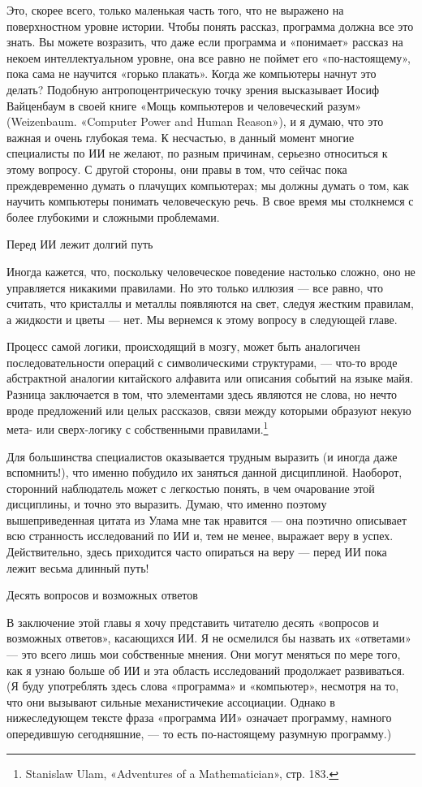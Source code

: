 \documentclass[../main.tex]{subfiles}
\begin{document}
Это, скорее всего, только маленькая часть того, что не выражено на поверхностном уровне истории. Чтобы понять рассказ, программа должна все это знать. Вы можете возразить, что даже если программа и «понимает» рассказ на некоем интеллектуальном уровне, она все равно не поймет его «по-настоящему», пока сама не научится «горько плакать». Когда же компьютеры начнут это делать? Подобную антропоцентрическую точку зрения высказывает Иосиф Вайценбаум в своей книге «Мощь компьютеров и человеческий разум» (Weizenbaum. «Computer Power and Human Reason»), и я думаю, что это важная и очень глубокая тема. К несчастью, в данный момент многие специалисты по ИИ не желают, по разным причинам, серьезно относиться к этому вопросу. С другой стороны, они правы в том, что сейчас пока преждевременно думать о плачущих компьютерах; мы должны думать о том, как научить компьютеры понимать человеческую речь. В свое время мы столкнемся с более глубокими и сложными проблемами.

Перед ИИ лежит долгий путь

Иногда кажется, что, поскольку человеческое поведение настолько сложно, оно не управляется никакими правилами. Но это только иллюзия --- все равно, что считать, что кристаллы и металлы появляются на свет, следуя жестким правилам, а жидкости и цветы --- нет. Мы вернемся к этому вопросу в следующей главе.

Процесс самой логики, происходящий в мозгу, может быть аналогичен последовательности операций с символическими структурами, --- что-то вроде абстрактной аналогии китайского алфавита или описания событий на языке майя. Разница заключается в том, что элементами здесь являются не слова, но нечто вроде предложений или целых рассказов, связи между которыми образуют некую мета- или сверх-логику с собственными правилами.\footnote{Stanislaw Ulam, «Adventures of a Mathematician», стр. 183.}

Для большинства специалистов оказывается трудным выразить (и иногда даже вспомнить!), что именно побудило их заняться данной дисциплиной. Наоборот, сторонний наблюдатель может с легкостью понять, в чем очарование этой дисциплины, и точно это выразить. Думаю, что именно поэтому вышеприведенная цитата из Улама мне так нравится --- она поэтично описывает всю странность исследований по ИИ и, тем не менее, выражает веру в успех. Действительно, здесь приходится часто опираться на веру --- перед ИИ пока лежит весьма длинный путь!

Десять вопросов и возможных ответов

В заключение этой главы я хочу представить читателю десять «вопросов и возможных ответов», касающихся ИИ\@. Я не осмелился бы назвать их «ответами» --- это всего лишь мои собственные мнения. Они могут меняться по мере того, как я узнаю больше об ИИ и эта область исследований продолжает развиваться. (Я буду употреблять здесь слова «программа» и «компьютер», несмотря на то, что они вызывают сильные механистичекие ассоциации. Однако в нижеследующем тексте фраза «программа ИИ» означает программу, намного опередившую сегодняшние, --- то есть по-настоящему разумную программу.)
\end{document}
